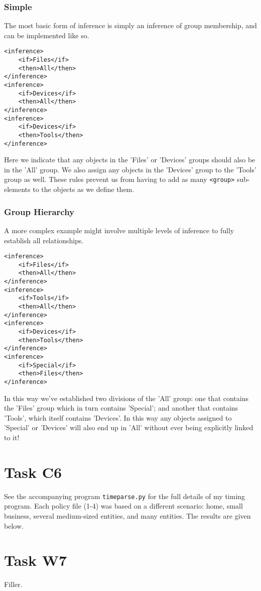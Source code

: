 \documentclass{article}
\providecommand{\task}[1]{\section{Task #1}}
\providecommand{\inlinecode}{\texttt}
\begin{document}
\subsubsection{Simple}
The most basic form of inference is simply an inference of group membership, and can be implemented like so.
\begin{lstlisting}
<inference>
    <if>Files</if>
    <then>All</then>
</inference>
<inference>
    <if>Devices</if>
    <then>All</then>
</inference>
<inference>
    <if>Devices</if>
    <then>Tools</then>
</inference>
\end{lstlisting}
Here we indicate that any objects in the 'Files' or 'Devices' groups should also be in the 'All' group. We also assign any objects in the 'Devices' group to the 'Tools' group as well. These rules prevent us from having to add as many \inlinecode{<group>} sub-elements to the objects as we define them.

\subsubsection{Group Hierarchy}
A more complex example might involve multiple levels of inference to fully establish all relationships.
\begin{lstlisting}
<inference>
    <if>Files</if>
    <then>All</then>
</inference>
<inference>
    <if>Tools</if>
    <then>All</then>
</inference>
<inference>
    <if>Devices</if>
    <then>Tools</then>
</inference>
<inference>
    <if>Special</if>
    <then>Files</then>
</inference>
\end{lstlisting}
In this way we've established two divisions of the 'All' group: one that contains the 'Files' group which in turn contains 'Special'; and another that contains 'Tools', which itself contains 'Devices'. In this way any objects assigned to 'Special' or 'Devices' will also end up in 'All' without ever being explicitly linked to it!

\task{C6}
See the accompanying program \inlinecode{timeparse.py} for the full details of my timing program. Each policy file (1-4) was based on a different scenario: home, small business, several medium-sized entities, and many entities. The results are given below.

\task{W7}
Filler.

\pagebreak

\printbibliography[heading=bibintoc]
\end{document}
